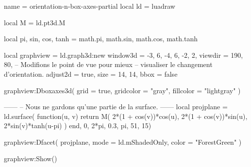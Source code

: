 \documentclass[border = 3pt]{standalone}
\begin{document}
\begin{luadraw}{name = orientation-n-box-axes-partial}
local ld = luadraw

local M = ld.pt3d.M

local pi, sin, cos, tanh = math.pi, math.sin, math.cos, math.tanh

local graphview = ld.graph3d:new{
  window3d = {-3, 6, -4, 6, -2, 2},
  viewdir  = {190, 80},  -- Modifions le point de vue pour mieux
                         -- visualiser le changement d'orientation.
  adjust2d = true,
  size     = {14, 14},
  bbox     = false
}

graphview:Dboxaxes3d({
  grid      = true,
  gridcolor = "gray",
  fillcolor = "lightgray"
})

------
-- Nous ne gardons qu'une partie de la surface.
------
local projplane = ld.surface(
  function(u, v)
    return M(
      2*(1 + cos(v))*cos(u),
      2*(1 + cos(v))*sin(u),
      2*sin(v)*tanh(u-pi)
    )
  end,
  0, 2*pi, 0.3, pi,
  {51, 15})

graphview:Dfacet(
  projplane,
  {
    mode  = ld.mShadedOnly,
    color = "ForestGreen"
  })

graphview:Show()
\end{luadraw}
\end{document}
